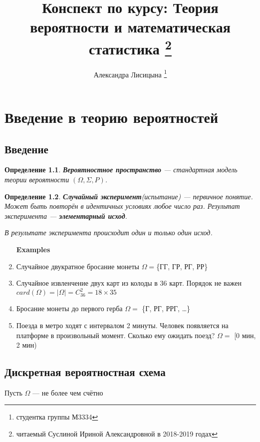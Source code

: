 \documentclass[10pt,a4paper,oneside,titlepage]{book}
\title{Конспект по курсу: Теория вероятности и математическая статистика \thanks{читаемый Суслиной Ириной Александровной в 2018-2019 годах}}
\author{Александра Лисицына \thanks{студентка группы М3334}}
\theoremstyle{plain}
\theoremstyle{defenition}
\newtheorem{defenition}{Определение}[section]
\theoremstyle{remark}
\begin{document}
\maketitle

\tableofcontents

\clearpage

\chapter{Введение в теорию вероятностей}

\section{Введение}

\begin{defenition}
	{\bfseries Вероятностное пространство} --- стандартная модель теории вероятности $(\Omega, \Sigma, P)$.
\end{defenition}

\begin{defenition}
	{\bfseries Случайный эксперимент}(испытание) --- первичное понятие. Может быть повторён в идентичных условиях любое число раз. Результат эксперимента --- {\bfseries элементарный исход}.
	
	В результате эксперимента происходит один и только один исход. 
\end{defenition}

\begin{enumerate}
	\item [\textbf{Examples}]
	\item Случайное двукратное бросание монеты
	$\Omega=$\{ГГ, ГР, РГ, РР\} 
	\item Случайное извленчение двух карт из колоды в 36 карт. Порядок не важен
	$card(\Omega)=|\Omega|=C^2_{36}=18\times35$
	\item Бросание монеты до первого герба
	$\Omega=$ \{Г, РГ, РРГ, \ldots\}
	\item Поезда в метро ходят с интервалом 2 минуты. Человек появляется на платформе в произвольный момент. Сколько ему ожидать поезд?
	$\Omega=$ [0 мин, 2 мин)
\end{enumerate}

\section{Дискретная вероятностная схема}

Пусть $\Omega$ --- не более чем счётно
\end{document}
